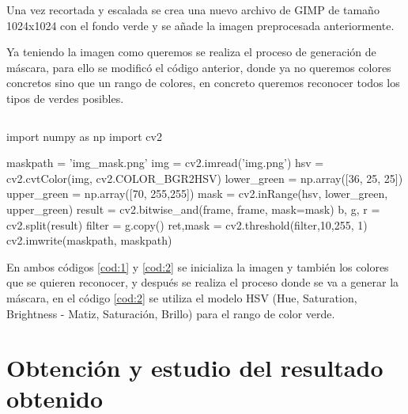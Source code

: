 Una vez recortada y escalada se crea una nuevo archivo de GIMP de tamaño 1024x1024 con el fondo verde y se añade la imagen preprocesada anteriormente.

Ya teniendo la imagen como queremos se realiza el proceso de generación de máscara, para ello se modificó el código anterior, donde ya no queremos colores concretos sino que un rango de colores, en concreto queremos reconocer todos los tipos de verdes posibles.
\pagebreak

\begin{lstlisting}[caption={Código obtención máscara 2}, label=cod:2]
\end{lstlisting}
\begin{python}
	import numpy as np
	import cv2 
	
	maskpath = 'img_mask.png'
	img = cv2.imread('img.png')
	hsv = cv2.cvtColor(img, cv2.COLOR_BGR2HSV)
	lower_green = np.array([36, 25, 25])
	upper_green = np.array([70, 255,255])
	mask = cv2.inRange(hsv, lower_green, upper_green)
	result = cv2.bitwise_and(frame, frame, mask=mask)
	b, g, r = cv2.split(result)
	filter = g.copy()
	ret,mask = cv2.threshold(filter,10,255, 1)
	cv2.imwrite(maskpath, maskpath)
\end{python}

En ambos códigos \ref{cod:1} y \ref{cod:2} se inicializa la imagen y también los colores que se quieren reconocer, y después se realiza el proceso donde se va a generar la máscara, en el código \ref{cod:2} se utiliza el modelo HSV (Hue, Saturation, Brightness - Matiz, Saturación, Brillo) para el rango de color verde.



\section{Obtención y estudio del resultado obtenido}

